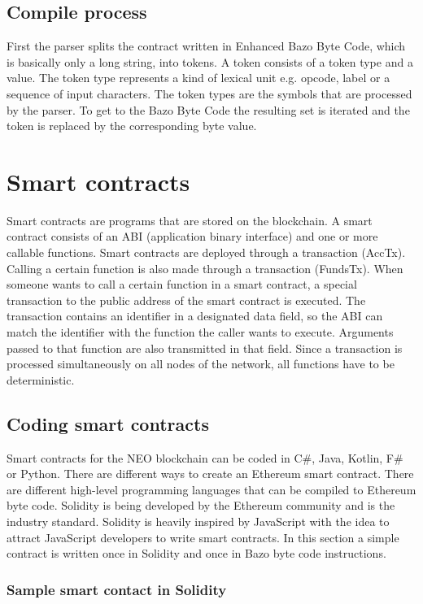 \subsection{Compile process}
First the parser splits the contract written in \flqq Enhanced Bazo Byte Code\frqq{}, which is basically only a long string, into tokens. A token consists of a token type and a value. The token type represents a kind of lexical unit e.g. opcode, label or a sequence of input characters. The token types are the symbols that are processed by the parser. \cite{aho_compilers:_2007} To get to the \flqq Bazo Byte Code\frqq{} the resulting set is iterated and the token is replaced by the corresponding byte value.

\section{Smart contracts}
Smart contracts are programs that are stored on the blockchain. A smart contract consists of an ABI (application binary interface) and one or more callable functions. Smart contracts are deployed through a transaction (AccTx). Calling a certain function is also made through a transaction (FundsTx). When someone wants to call a certain function in a smart contract, a special transaction to the public address of the smart contract is executed. The transaction contains an identifier in a designated data field, so the ABI can match the identifier with the function the caller wants to execute. Arguments passed to that function are also transmitted in that field. Since a transaction is processed simultaneously on all nodes of the network, all functions have to be deterministic.

\subsection{Coding smart contracts}
Smart contracts for the NEO blockchain can be coded in C\#, Java, Kotlin, F\# or Python. There are different ways to create an Ethereum smart contract. There are different high-level programming languages that can be compiled to Ethereum byte code. Solidity is being developed by the Ethereum community and is the industry standard. Solidity is heavily inspired by JavaScript with the idea to attract JavaScript developers to write smart contracts. In this section a simple contract is written once in Solidity and once in Bazo byte code instructions.

\subsubsection{Sample smart contact in Solidity}

